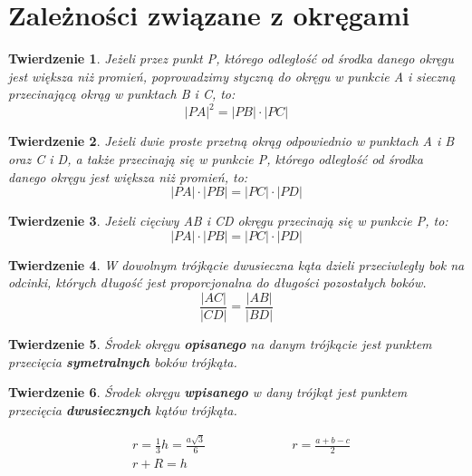 \documentclass{article}
\numberwithin{equation}{section}
\newtheorem{theorem}{Twierdzenie}[section]
\begin{document}
  \section{Zależności związane z okręgami}
    \begin{theorem}
      Jeżeli przez punkt P, którego odległość od środka danego okręgu jest większa niż promień, poprowadzimy styczną do okręgu w punkcie A i sieczną przecinającą okrąg w punktach B i C, to:
      \begin{equation}
        |PA|^2 = |PB| \cdot |PC|
      \end{equation}
    \end{theorem}
    \begin{theorem}
      Jeżeli dwie proste przetną okrąg odpowiednio w punktach A i B oraz C i D, a także przecinają się w punkcie P, którego odległość od środka danego okręgu jest większa niż promień, to:
      \begin{equation}
        |PA| \cdot |PB| = |PC| \cdot |PD|
      \end{equation}
    \end{theorem}
    \begin{theorem}
      Jeżeli cięciwy AB i CD okręgu przecinają się w punkcie P, to:
      \begin{equation}
        |PA| \cdot |PB| = |PC| \cdot |PD|
      \end{equation}
    \end{theorem}
    \begin{theorem}
      W dowolnym trójkącie dwusieczna kąta dzieli przeciwległy bok na odcinki, których długość jest proporcjonalna do długości pozostałych boków.
      \begin{equation}
        \frac{|AC|}{|CD|} = \frac{|AB|}{|BD|}
      \end{equation}
    \end{theorem}
    \begin{theorem}
      Środek okręgu \textbf{opisanego} na danym trójkącie jest punktem przecięcia \textbf{symetralnych} boków trójkąta.
    \end{theorem}
    \begin{theorem}
      Środek okręgu \textbf{wpisanego} w dany trójkąt jest punktem przecięcia \textbf{dwusiecznych} kątów trójkąta.
    \end{theorem}
    \begin{equation}
      \begin{aligned}
        &r = \frac 13h = \frac{a\sqrt3}{6}\qquad\qquad\qquad&r = \frac{a+b-c}{2}\\
        &r + R = h
      \end{aligned}
    \end{equation}
\end{document}
